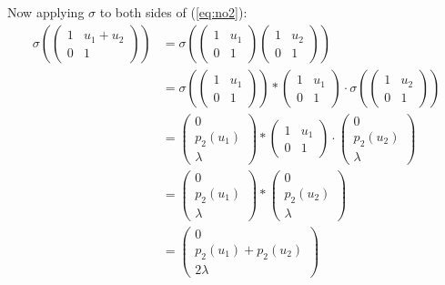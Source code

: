 														Now applying $\sigma$ to both sides of (\ref{eq:no2}):
															\begin{align*}
	\sigma\left(
			\left(\begin{matrix} 1 & u_1 + u_2 \\ 0 & 1 \end{matrix}\right)
			\right)
	&=
	\sigma\left(
			\left(\begin{matrix} 1 & u_1 \\ 0 & 1 \end{matrix}\right) 
			\left(\begin{matrix} 1 & u_2 \\ 0 & 1 \end{matrix}\right)
			\right) \\
		&=
	\sigma\left(
			\left(\begin{matrix} 1 & u_1 \\ 0 & 1 \end{matrix}\right)
			\right) *
	\left(\begin{matrix} 1 & u_1 \\ 0 & 1 \end{matrix}\right) \cdot
	\sigma\left(
			\left(\begin{matrix} 1 & u_2 \\ 0 & 1 \end{matrix}\right)
			\right) \\
	&=
\left(\begin{matrix} 0 \\ p_2(u_1) \\ \lambda \end{matrix}\right)
	*
	\left(\begin{matrix} 1 & u_1 \\ 0 & 1 \end{matrix}\right) \cdot
	\left(\begin{matrix} 0 \\ p_2(u_2) \\ \lambda \end{matrix}\right) \\
	&=
\left(\begin{matrix} 0 \\ p_2(u_1) \\ \lambda \end{matrix}\right)
	*
	\left(\begin{matrix} 0 \\ p_2(u_2) \\ \lambda \end{matrix}\right) \\
	&=
\left(\begin{matrix} 0 \\ p_2(u_1) + p_2(u_2)\\ 2\lambda \end{matrix}\right)
	\end{align*}

